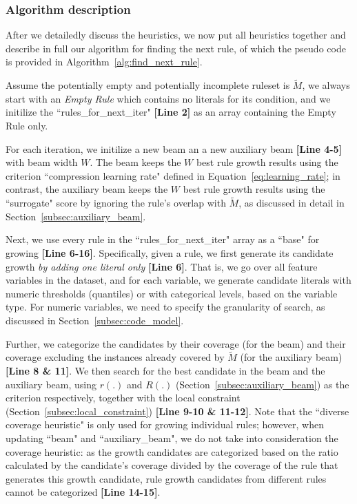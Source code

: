  

\subsubsection{Algorithm description}
 After we detailedly discuss the heuristics, we now put all heuristics together and describe in full our algorithm for finding the next rule, of which the pseudo code is provided in Algorithm~\ref{alg:find_next_rule}. 

Assume the potentially empty and potentially incomplete ruleset is $\tilde{M}$, we always start with an \emph{Empty Rule} which contains no literals for its condition, and we initilize the ``rules\_for\_next\_iter" \textbf{[Line 2]} as an array containing the Empty Rule only. 

For each iteration, we initilize a new beam an a new auxiliary beam \textbf{[Line 4-5]} with beam width $W$. The beam keeps the $W$ best rule growth results using the criterion ``compression learning rate" defined in Equation~\ref{eq:learning_rate}; in contrast, the auxiliary beam keeps the $W$ best rule growth results using the ``surrogate" score by ignoring the rule's overlap with $\tilde{M}$, as discussed in detail in Section~\ref{subsec:auxiliary_beam}. 

Next, we use every rule in the ``rules\_for\_next\_iter" array as a ``base" for growing \textbf{[Line 6-16]}. Specifically, given a rule, we first generate its candidate growth \emph{by adding one literal only} \textbf{[Line 6]}. That is, we go over all feature variables in the dataset, and for each variable, we generate candidate literals with numeric thresholds (quantiles) or with categorical levels, based on the variable type. For numeric variables, we need to specify the granularity of search, as discussed in Section~\ref{subsec:code_model}.

Further, we categorize the candidates by their coverage (for the beam) and their coverage excluding the instances already covered by $\tilde{M}$ (for the auxiliary beam) \textbf{[Line 8 \& 11]}. We then search for the best candidate in the beam and the auxiliary beam, using $r(.)$ and $R(.)$ (Section~\ref{subsec:auxiliary_beam}) as the criterion respectively, together with the local constraint (Section~\ref{subsec:local_constraint}) \textbf{[Line 9-10 \& 11-12]}. Note that the ``diverse coverage heuristic" is only used for growing individual rules; however, when updating ``beam" and ``auxiliary\_beam", we do not take into consideration the coverage heuristic: as the growth candidates are categorized based on the ratio calculated by the candidate's coverage divided by the coverage of the rule that generates this growth candidate, rule growth candidates from different rules cannot be categorized \textbf{[Line 14-15]}. 

